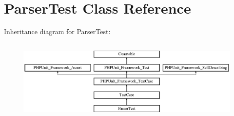 \hypertarget{class_symfony_1_1_component_1_1_yaml_1_1_tests_1_1_parser_test}{}\section{Parser\+Test Class Reference}
\label{class_symfony_1_1_component_1_1_yaml_1_1_tests_1_1_parser_test}
Inheritance diagram for Parser\+Test\+:\begin{figure}[H]
\begin{center}
\leavevmode
\includegraphics[height=4.129793cm]{class_symfony_1_1_component_1_1_yaml_1_1_tests_1_1_parser_test}
\end{center}
\end{figure}
